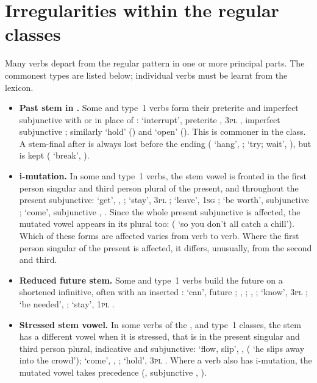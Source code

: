 \section{Irregularities within the regular classes}\label{sec:verb-irregularities}
Many verbs depart from the regular pattern in one or more principal parts. The commonest types are listed below; individual verbs must be learnt from the lexicon.
\begin{itemize}
    \item \textbf{Past stem in .} Some  and type~1  verbs form their preterite and imperfect subjunctive with  or  in place of :  `interrupt', preterite , 3\textsc{pl} , imperfect subjunctive ; similarly  `hold' () and  `open' (). This is commoner in the  class. A stem-final  after  is always lost before the ending ( `hang', ;  `try; wait', ), but  is kept ( `break', ).
    \item \textbf{i-mutation.} In some  and type~1  verbs, the stem vowel is fronted in the first person singular and third person plural of the present, and throughout the present subjunctive:  `get', , ;  `stay', 3\textsc{pl} ;  `leave', 1\textsc{sg} ;  `be worth', subjunctive ;  `come', subjunctive , . Since the whole present subjunctive is affected, the mutated vowel appears in its plural too:  ( `so you don't all catch a chill'). Which of these forms are affected varies from verb to verb. Where the first person singular of the present is affected, it differs, unusually, from the second and third.
    \item \textbf{Reduced future stem.} Some  and type~1  verbs build the future on a shortened infinitive, often with an inserted :  `can', future ; , ; , ;  `know', 3\textsc{pl} ;  `be needed', ;  `stay', 1\textsc{pl} .
    \item \textbf{Stressed stem vowel.} In some verbs of the ,  and type~1  classes, the stem has a different vowel when it is stressed, that is in the present singular and third person plural, indicative and subjunctive:  `flow, slip', ,  ( `he slips away into the crowd');  `come', , ;  `hold', 3\textsc{pl} . Where a verb also has i-mutation, the mutated vowel takes precedence (, subjunctive , ).

\end{itemize}
